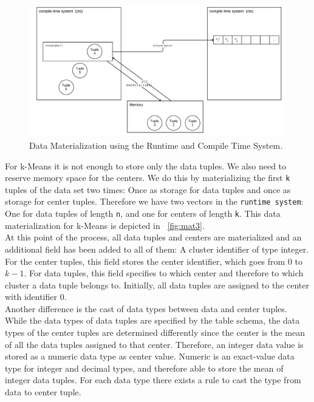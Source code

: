 \begin{figure}[htsb]
  \centerline{
  \includegraphics[scale=0.04]{figures/mat2_font}
  }
  \caption[Data Materialization using the Runtime and Compile Time System]{Data Materialization using the Runtime and Compile Time System.}
  \label{fig:mat2}
\end{figure}

For k-Means it is not enough to store only the data tuples. We also need to reserve memory space for the centers. We do this by materializing the first \texttt{k} tuples of the data set two times: Once as storage for data tuples and once as storage for center tuples. Therefore we have two vectors in the \texttt{runtime system}: One for data tuples of length \texttt{n}, and one for centers of length \texttt{k}. This data materialization for k-Means is depicted in ~\autoref{fig:mat3}.
\\ 
At this point of the process, all data tuples and centers are materialized and an additional field has been added to all of them: A cluster identifier of type integer. For the center tuples, this field stores the center identifier, which goes from 0 to $k - 1$. For data tuples, this field specifies to which center and therefore to which cluster a data tuple belongs to. Initially, all data tuples are assigned to the center with identifier 0. 
\\
Another difference is the cast of data types between data and center tuples. While the data types of data tuples are specified by the table schema, the data types of the center tuples are determined differently since the center is the mean of all the data tuples assigned to that center. Therefore, an integer data value is stored as a numeric data type as center value. Numeric is an exact-value data type for integer and decimal types, and therefore able to store the mean of integer data tuples. For each data type there exists a rule to cast the type from data to center tuple.



